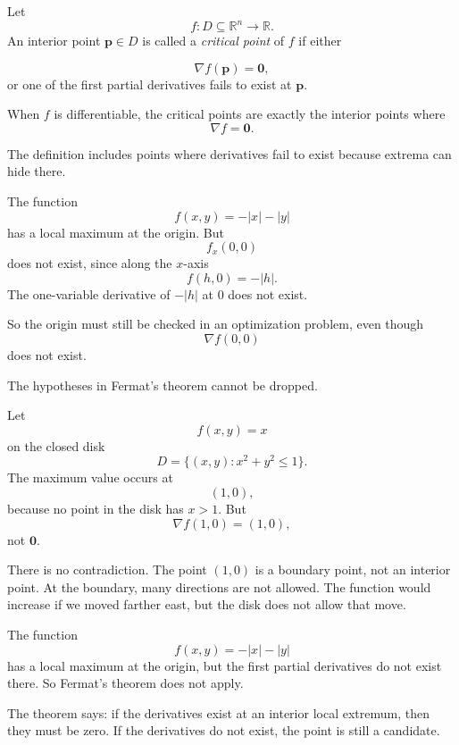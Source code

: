 \begin{definition}
Let
\[
    f:D\subseteq\mathbb R^n\to\mathbb R.
\]
An interior point \(\mathbf p\in D\) is called a \emph{critical point} of \(f\) if either

\[
    \nabla f(\mathbf p)=\mathbf 0,
\]
or one of the first partial derivatives fails to exist at \(\mathbf p\).

When \(f\) is differentiable, the critical points are exactly the interior points where
\[
    \nabla f=\mathbf 0.
\]
\end{definition}

The definition includes points where derivatives fail to exist because extrema can hide
there.

\begin{example}
The function
\[
    f(x,y)=-|x|-|y|
\]
has a local maximum at the origin.  But
\[
    f_x(0,0)
\]
does not exist, since along the \(x\)-axis
\[
    f(h,0)=-|h|.
\]
The one-variable derivative of \(-|h|\) at \(0\) does not exist.

So the origin must still be checked in an optimization problem, even though
\[
    \nabla f(0,0)
\]
does not exist.
\end{example}

The hypotheses in Fermat's theorem cannot be dropped.

\begin{example}
Let
\[
    f(x,y)=x
\]
on the closed disk
\[
    D=\{(x,y):x^2+y^2\le1\}.
\]
The maximum value occurs at
\[
    (1,0),
\]
because no point in the disk has \(x>1\).  But
\[
    \nabla f(1,0)=(1,0),
\]
not \(\mathbf 0\).

There is no contradiction.  The point \((1,0)\) is a boundary point, not an interior
point.  At the boundary, many directions are not allowed.  The function would increase
if we moved farther east, but the disk does not allow that move.
\end{example}

\begin{example}
The function
\[
    f(x,y)=-|x|-|y|
\]
has a local maximum at the origin, but the first partial derivatives do not exist there.
So Fermat's theorem does not apply.

The theorem says: if the derivatives exist at an interior local extremum, then they must
be zero.  If the derivatives do not exist, the point is still a candidate.
\end{example}

